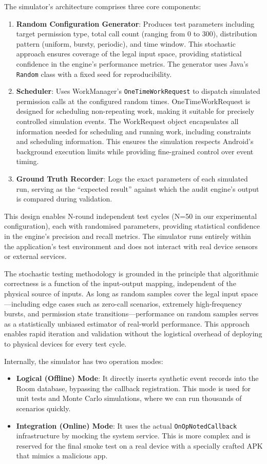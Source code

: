 The simulator's architecture comprises three core components:
\begin{enumerate}
\item \textbf{Random Configuration Generator}: Produces test parameters including target permission type, total call count (ranging from 0 to 300), distribution pattern (uniform, bursty, periodic), and time window. This stochastic approach ensures coverage of the legal input space, providing statistical confidence in the engine's performance metrics. The generator uses Java's \texttt{Random} class with a fixed seed for reproducibility.
\item \textbf{Scheduler}: Uses WorkManager's \texttt{OneTimeWorkRequest} to dispatch simulated permission calls at the configured random times. OneTimeWorkRequest is designed for scheduling non-repeating work, making it suitable for precisely controlled simulation events. The WorkRequest object encapsulates all information needed for scheduling and running work, including constraints and scheduling information. This ensures the simulation respects Android's background execution limits while providing fine-grained control over event timing.
\item \textbf{Ground Truth Recorder}: Logs the exact parameters of each simulated run, serving as the ``expected result'' against which the audit engine's output is compared during validation.
\end{enumerate}

This design enables N-round independent test cycles (N=50 in our experimental configuration), each with randomised parameters, providing statistical confidence in the engine's precision and recall metrics. The simulator runs entirely within the application's test environment and does not interact with real device sensors or external services.

The stochastic testing methodology is grounded in the principle that algorithmic correctness is a function of the input-output mapping, independent of the physical source of inputs. As long as random samples cover the legal input space—including edge cases such as zero-call scenarios, extremely high-frequency bursts, and permission state transitions—performance on random samples serves as a statistically unbiased estimator of real-world performance. This approach enables rapid iteration and validation without the logistical overhead of deploying to physical devices for every test cycle.

Internally, the simulator has two operation modes:
\begin{itemize}
\item \textbf{Logical (Offline) Mode}: It directly inserts synthetic event records into the Room database, bypassing the callback registration. This mode is used for unit tests and Monte Carlo simulations, where we can run thousands of scenarios quickly.
\item \textbf{Integration (Online) Mode}: It uses the actual \texttt{OnOpNotedCallback} infrastructure by mocking the system service. This is more complex and is reserved for the final smoke test on a real device with a specially crafted APK that mimics a malicious app.
\end{itemize}

